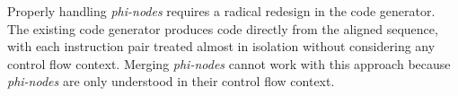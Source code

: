 










Properly handling \textit{phi-nodes} requires a radical redesign in the code generator. The existing code generator produces code directly
from the aligned sequence, with each instruction pair treated almost in isolation without considering any control flow context. Merging
\textit{phi-nodes} cannot work with this approach because \textit{phi-nodes} are only understood in their control flow context.

